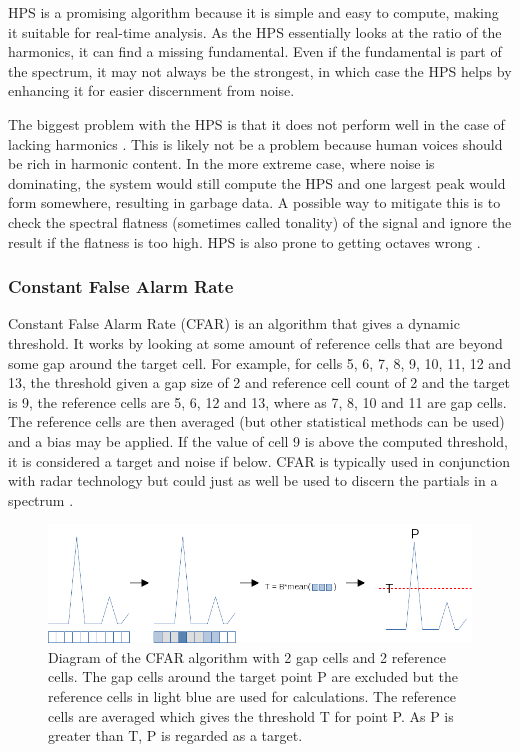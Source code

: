 HPS is a promising algorithm because it is simple and easy to compute, making it suitable for real-time analysis. As the HPS essentially looks at the ratio of the harmonics, it can find a missing fundamental. Even if the fundamental is part of the spectrum, it may not always be the strongest, in which case the HPS helps by enhancing it for easier discernment from noise.

The biggest problem with the HPS is that it does not perform well in the case of lacking harmonics \cite{McLeod2008}. This is likely not be a problem because human voices should be rich in harmonic content. In the more extreme case, where noise is dominating, the system would still compute the HPS and one largest peak would form somewhere, resulting in garbage data. A possible way to mitigate this is to check the spectral flatness (sometimes called tonality) of the signal and ignore the result if the flatness is too high. HPS is also prone to getting octaves wrong \cite{Smyth2019}.
\subsubsection{Constant False Alarm Rate}
Constant False Alarm Rate (CFAR) is an algorithm that gives a dynamic threshold. It works by looking at some amount of reference cells that are beyond some gap around the target cell. For example, for cells 5, 6, 7, 8, 9, 10, 11, 12 and 13, the threshold given a gap size of 2 and reference cell count of 2 and the target is 9, the reference cells are 5, 6, 12 and 13, where as 7, 8, 10 and 11 are gap cells. The reference cells are then averaged (but other statistical methods can be used) and a bias may be applied. If the value of cell 9 is above the computed threshold, it is considered a target and noise if below. CFAR is typically used in conjunction with radar technology but could just as well be used to discern the partials in a spectrum \cite{Bruner2024}. 

\begin{figure}[ht]
    \centering
    \includegraphics[width=\textwidth]{./images/cfar.png}
    \caption{Diagram of the CFAR algorithm with 2 gap cells and 2 reference cells. The gap cells around the target point P are excluded but the reference cells in light blue are used for calculations. The reference cells are averaged which gives the threshold T for point P. As P is greater than T, P is regarded as a target.\label{fig:cfar}}
\end{figure}

